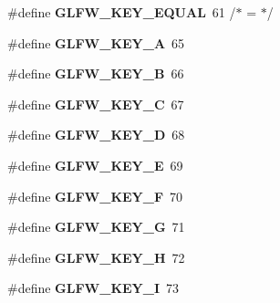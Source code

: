 \begin{DoxyCompactItemize}
\item 
\hypertarget{group__keys_gae1a2de47240d6664423c204bdd91bd17}{}\#define {\bfseries G\+L\+F\+W\+\_\+\+K\+E\+Y\+\_\+\+E\+Q\+U\+A\+L}~61  /$\ast$ = $\ast$/\label{group__keys_gae1a2de47240d6664423c204bdd91bd17}

\item 
\hypertarget{group__keys_ga03e842608e1ea323370889d33b8f70ff}{}\#define {\bfseries G\+L\+F\+W\+\_\+\+K\+E\+Y\+\_\+\+A}~65\label{group__keys_ga03e842608e1ea323370889d33b8f70ff}

\item 
\hypertarget{group__keys_ga8e3fb647ff3aca9e8dbf14fe66332941}{}\#define {\bfseries G\+L\+F\+W\+\_\+\+K\+E\+Y\+\_\+\+B}~66\label{group__keys_ga8e3fb647ff3aca9e8dbf14fe66332941}

\item 
\hypertarget{group__keys_ga00ccf3475d9ee2e679480d540d554669}{}\#define {\bfseries G\+L\+F\+W\+\_\+\+K\+E\+Y\+\_\+\+C}~67\label{group__keys_ga00ccf3475d9ee2e679480d540d554669}

\item 
\hypertarget{group__keys_ga011f7cdc9a654da984a2506479606933}{}\#define {\bfseries G\+L\+F\+W\+\_\+\+K\+E\+Y\+\_\+\+D}~68\label{group__keys_ga011f7cdc9a654da984a2506479606933}

\item 
\hypertarget{group__keys_gabf48fcc3afbe69349df432b470c96ef2}{}\#define {\bfseries G\+L\+F\+W\+\_\+\+K\+E\+Y\+\_\+\+E}~69\label{group__keys_gabf48fcc3afbe69349df432b470c96ef2}

\item 
\hypertarget{group__keys_ga5df402e02aca08444240058fd9b42a55}{}\#define {\bfseries G\+L\+F\+W\+\_\+\+K\+E\+Y\+\_\+\+F}~70\label{group__keys_ga5df402e02aca08444240058fd9b42a55}

\item 
\hypertarget{group__keys_gae74ecddf7cc96104ab23989b1cdab536}{}\#define {\bfseries G\+L\+F\+W\+\_\+\+K\+E\+Y\+\_\+\+G}~71\label{group__keys_gae74ecddf7cc96104ab23989b1cdab536}

\item 
\hypertarget{group__keys_gad4cc98fc8f35f015d9e2fb94bf136076}{}\#define {\bfseries G\+L\+F\+W\+\_\+\+K\+E\+Y\+\_\+\+H}~72\label{group__keys_gad4cc98fc8f35f015d9e2fb94bf136076}

\item 
\hypertarget{group__keys_ga274655c8bfe39742684ca393cf8ed093}{}\#define {\bfseries G\+L\+F\+W\+\_\+\+K\+E\+Y\+\_\+\+I}~73\label{group__keys_ga274655c8bfe39742684ca393cf8ed093}


\end{DoxyCompactItemize}
